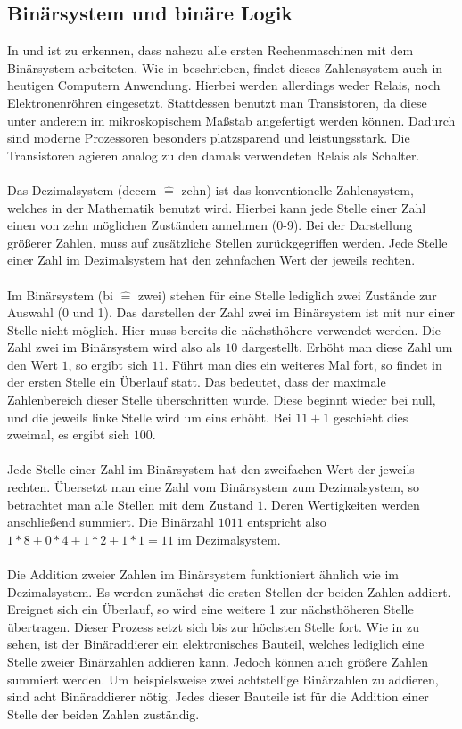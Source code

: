\subsection{Binärsystem und binäre Logik} \label{BinarySystem}
In \cite{konradz1z2} und \cite{bruderer2011konrad} ist zu erkennen, dass nahezu alle ersten Rechenmaschinen mit dem Binärsystem arbeiteten. Wie in \cite{zimmermann1998binary} beschrieben, findet dieses Zahlensystem auch in heutigen Computern Anwendung. Hierbei werden allerdings weder Relais, noch Elektronenröhren eingesetzt. Stattdessen benutzt man Transistoren, da diese unter anderem im mikroskopischem Maßstab angefertigt werden können. Dadurch sind moderne Prozessoren besonders platzsparend und leistungsstark. Die Transistoren agieren analog zu den damals verwendeten Relais als Schalter.\\\\
Das Dezimalsystem (\glqq{}decem\grqq{} $\widehat{=}$ zehn) ist das konventionelle Zahlensystem, welches in der Mathematik benutzt wird. Hierbei kann jede Stelle einer Zahl einen von zehn möglichen Zuständen annehmen (0-9). Bei der Darstellung größerer Zahlen, muss auf zusätzliche Stellen zurückgegriffen werden. Jede Stelle einer Zahl im Dezimalsystem hat den zehnfachen Wert der jeweils rechten.\\\\
Im Binärsystem (\glqq{}bi\grqq{} $\widehat{=}$ zwei) stehen für eine Stelle lediglich zwei Zustände zur Auswahl (0 und 1). Das darstellen der Zahl zwei im Binärsystem ist mit nur einer Stelle nicht möglich. Hier muss bereits die nächsthöhere verwendet werden. Die Zahl zwei im Binärsystem wird also als $10$ dargestellt. Erhöht man diese Zahl um den Wert $1$, so ergibt sich $11$. Führt man dies ein weiteres Mal fort, so findet in der ersten Stelle ein \glqq{}Überlauf\grqq{} statt. Das bedeutet, dass der maximale Zahlenbereich dieser Stelle überschritten wurde. Diese beginnt wieder bei null, und die jeweils linke Stelle wird um eins erhöht. Bei $11 + 1$ geschieht dies zweimal, es ergibt sich $100$.\\\\
Jede Stelle einer Zahl im Binärsystem hat den zweifachen Wert der jeweils rechten. Übersetzt man eine Zahl vom Binärsystem zum Dezimalsystem, so betrachtet man alle Stellen mit dem Zustand $1$. Deren Wertigkeiten werden anschließend summiert. Die Binärzahl $1011$ entspricht also $1*8 + 0*4 + 1*2 + 1*1 = 11$ im Dezimalsystem.\\\\
Die Addition zweier Zahlen im Binärsystem funktioniert ähnlich wie im Dezimalsystem. Es werden zunächst die ersten Stellen der beiden Zahlen addiert. Ereignet sich ein Überlauf, so wird eine weitere 1 zur nächsthöheren Stelle übertragen. Dieser Prozess setzt sich bis zur höchsten Stelle fort. Wie in \cite{zimmermann1998binary} zu sehen, ist der Binäraddierer ein elektronisches Bauteil, welches lediglich eine Stelle zweier Binärzahlen addieren kann. Jedoch können auch größere Zahlen summiert werden. Um beispielsweise zwei achtstellige Binärzahlen zu addieren, sind acht Binäraddierer nötig. Jedes dieser Bauteile ist für die Addition einer Stelle der beiden Zahlen zuständig.\\\\
